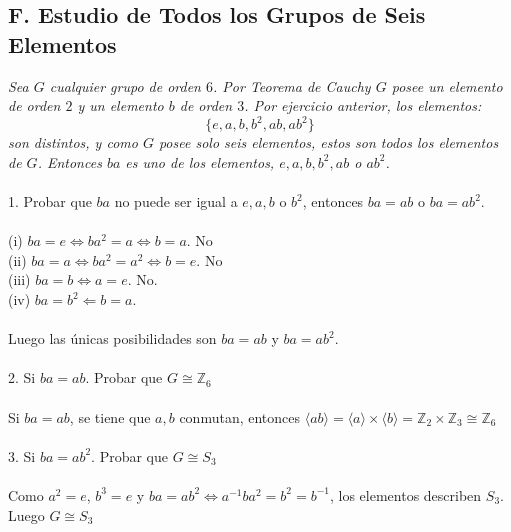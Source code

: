 \documentclass{article}
\newcommand{\Z}{\mathbb{Z}}
\begin{document}
\subsection*{F. Estudio de Todos los Grupos de Seis Elementos}
\textit{Sea $G$ cualquier grupo de orden $6$. Por Teorema de Cauchy $G$ posee un elemento de orden $2$ y un elemento $b$ de orden $3$. Por ejercicio anterior, los elementos:}
\begin{equation*}
    \{e,a,b,b^{2},ab,ab^2{} \}
\end{equation*}
\textit{son distintos, y como $G$ posee solo seis elementos, estos son todos los elementos de $G$. Entonces $ba$ es uno de los elementos, $e,a,b,b^{2},ab$ o $ab^{2}$.}
\\
\\
1. Probar que $ba$ no puede ser igual a $e,a,b$ o $b^{2}$, entonces $ba=ab$ o $ba=ab^{2}$.
\\
\\
(i) $ba=e \Longleftrightarrow ba^{2}=a \Longleftrightarrow b=a$. No
\\
(ii) $ba=a \Longleftrightarrow ba^{2}=a^{2} \Longleftrightarrow b=e$. No
\\
(iii) $ba=b \Longleftrightarrow a=e$. No.
\\
(iv) $ba=b^{2} \Longleftarrow b=a$.
\\
\\
Luego las únicas posibilidades son $ba=ab$ y $ba=ab^{2}$.
\\
\\
2. Si $ba=ab$. Probar que $G \cong \Z_{6}$
\\
\\
Si $ba=ab$, se tiene que $a,b$ conmutan, entonces $\langle ab \rangle = \langle a \rangle \times \langle b \rangle=\Z_{2} \times \Z_{3} \cong \Z_{6}$
\\
\\
3. Si $ba=ab^{2}$. Probar que $G \cong S_{3}$
\\
\\
Como $a^{2}=e$, $b^{3}=e$ y $ba=ab^{2} \Longleftrightarrow a^{-1}ba^{2}=b^{2}=b^{-1}$, los elementos describen $S_{3}$. Luego $G \cong S_{3}$
\end{document}
